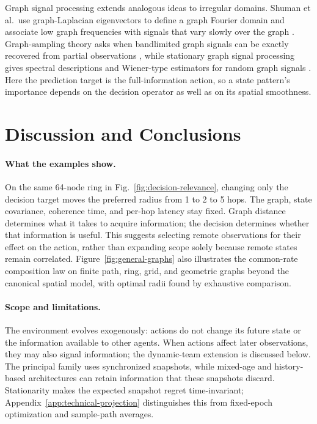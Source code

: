 \documentclass[11pt]{article}
\begin{document}
Graph signal processing extends analogous ideas to irregular domains. Shuman et al.\ use graph-Laplacian eigenvectors to define a graph Fourier domain and associate low graph frequencies with signals that vary slowly over the graph \cite{shuman2013emerging}. Graph-sampling theory asks when bandlimited graph signals can be exactly recovered from partial observations \cite{chen2015discrete}, while stationary graph signal processing gives spectral descriptions and Wiener-type estimators for random graph signals \cite{perraudin2017stationary}. Here the prediction target is the full-information action, so a state pattern's
importance depends on the decision operator as well as on its spatial smoothness.

\section{Discussion and Conclusions}
\label{sec:discussion_conclusions}

\paragraph{What the examples show.}
On the same 64-node ring in Fig.~\ref{fig:decision-relevance}, changing only
the decision target moves the preferred radius from 1 to 2 to 5 hops.
The graph, state covariance, coherence time, and per-hop latency stay fixed.
Graph distance determines what it takes to acquire information; the decision
determines whether that information is useful. This suggests selecting remote
observations for their effect on the action, rather than expanding scope
solely because remote states remain correlated.
Figure~\ref{fig:general-graphs} also illustrates the common-rate composition
law on finite path, ring, grid, and geometric graphs beyond the canonical
spatial model, with optimal radii found by exhaustive comparison.

\paragraph{Scope and limitations.}
The environment evolves exogenously: actions do not change its future state
or the information available to other agents. When actions affect later
observations, they may also signal information;
the dynamic-team extension is discussed below. The principal family uses
synchronized snapshots, while mixed-age and history-based architectures can
retain information that these snapshots discard. Stationarity makes the
expected snapshot regret time-invariant; Appendix~\ref{app:technical-projection}
distinguishes this from fixed-epoch optimization and sample-path averages.
\end{document}
